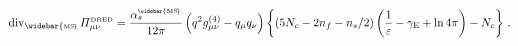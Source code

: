 \begin{equation}
\label{MS-scheme}
{\rm div}_{{\rm \widebar{\scriptscriptstyle MS\!}}} \,
{\mit\Pi}^{\mbox{\tiny DRED}}_{\mu\nu}
=
\frac{
\alpha_s^{_{\rm \widebar{\scriptscriptstyle MS\!}}}
}{ 12 \pi }
\left( q^2 g^{(4)}_{\mu\nu} - q_\mu q_\nu \right)
\left\{
\left( 5 N_c - 2 n_f - n_s/2 \right)
\left( \frac{1}{\varepsilon} - \gamma_{\rm E} + \ln 4 \pi \right)
- N_c
\right\}
\, .
\end{equation}

